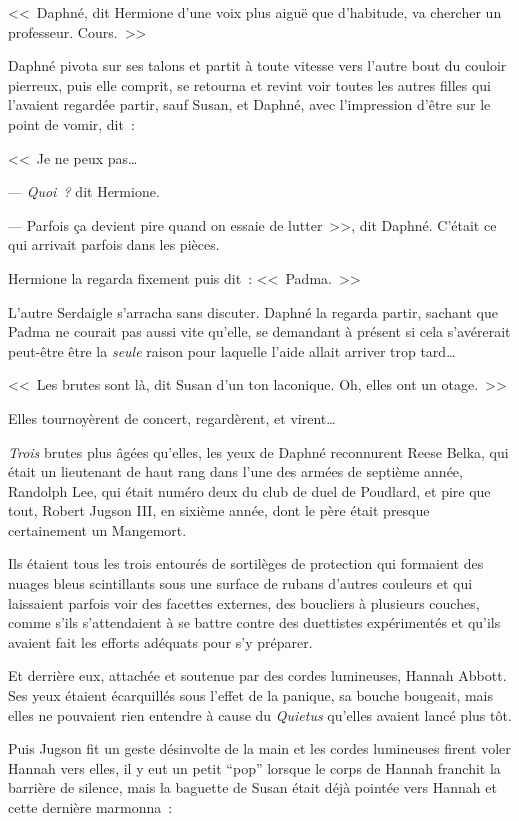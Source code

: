 <<~Daphné, dit Hermione d'une voix plus aiguë que d'habitude, va chercher un professeur. Cours.~>>

Daphné pivota sur ses talons et partit à toute vitesse vers l'autre bout du couloir pierreux, puis elle comprit, se retourna et revint voir toutes les autres filles qui l'avaient regardée partir, sauf Susan, et Daphné, avec l'impression d'être sur le point de vomir, dit~:

<<~Je ne peux pas…

--- \emph{Quoi~?} dit Hermione.

--- Parfois ça devient pire quand on essaie de lutter~>>, dit Daphné. C'était ce qui arrivait parfois dans les pièces.

Hermione la regarda fixement puis dit~: <<~Padma.~>>

L'autre Serdaigle s'arracha sans discuter. Daphné la regarda partir, sachant que Padma ne courait pas aussi vite qu'elle, se demandant à présent si cela s'avérerait peut-être être la \emph{seule} raison pour laquelle l'aide allait arriver trop tard…

<<~Les brutes sont là, dit Susan d'un ton laconique. Oh, elles ont un otage.~>>

Elles tournoyèrent de concert, regardèrent, et virent…

\emph{Trois} brutes plus âgées qu'elles, les yeux de Daphné reconnurent Reese Belka, qui était un lieutenant de haut rang dans l'une des armées de septième année, Randolph Lee, qui était numéro deux du club de duel de Poudlard, et pire que tout, Robert Jugson III, en sixième année, dont le père était presque certainement un Mangemort.

Ils étaient tous les trois entourés de sortilèges de protection qui formaient des nuages bleus scintillants sous une surface de rubans d'autres couleurs et qui laissaient parfois voir des facettes externes, des boucliers à plusieurs couches, comme s'ils s'attendaient à se battre contre des duettistes expérimentés et qu'ils avaient fait les efforts adéquats pour s'y préparer.

Et derrière eux, attachée et soutenue par des cordes lumineuses, Hannah Abbott. Ses yeux étaient écarquillés sous l'effet de la panique, sa bouche bougeait, mais elles ne pouvaient rien entendre à cause du \emph{Quietus} qu'elles avaient lancé plus tôt.

Puis Jugson fit un geste désinvolte de la main et les cordes lumineuses firent voler Hannah vers elles, il y eut un petit “pop” lorsque le corps de Hannah franchit la barrière de silence, mais la baguette de Susan était déjà pointée vers Hannah et cette dernière marmonna~:

